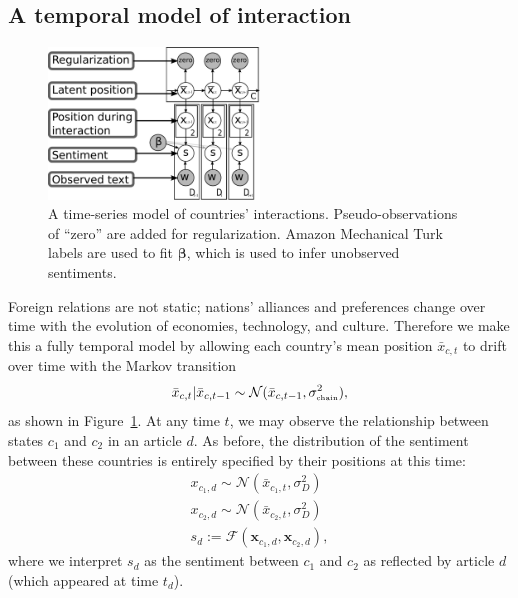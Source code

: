 \subsection{A temporal model of interaction}
\begin{figure}
  \center
  \vspace{-55pt}
  \includegraphics[width=0.5\textwidth]{chapter_foreign_relations/figures/countries_gm.pdf}
  \caption{A time-series model of countries' interactions.
    Pseudo-observations of ``zero'' are added for regularization.
    Amazon Mechanical Turk labels are used to fit $\bm \beta$, which is
    used to infer unobserved sentiments.}
  \label{fig:fa_gm}
\end{figure}

Foreign relations are not static; nations' alliances and preferences
change over time with the evolution of economies, technology, and
culture.  Therefore we make this a fully temporal model by
allowing each country's mean position $\bar x_{c,t}$ to drift over
time with the Markov transition
\begin{align}
  \label{eq:fr_interaction_position_given_mean}
  \bar x_{c,t} | \bar x_{c,t-1} \sim \mathcal{N}(\bar x_{c,t-1},
  \sigma_{\mbox{\tiny chain}}^2),
\end{align}
as shown in Figure~\ref{fig:fa_gm}. At any time $t$, we may observe
the relationship between states $c_1$ and $c_2$ in an article $d$.  As
before, the distribution of the sentiment between these countries is
entirely specified by their positions at this time:
\begin{align}
  x_{c_1,d} \sim \mathcal{N}(\bar x_{c_1, t}, \sigma_D^2) \nonumber \\
  x_{c_2,d} \sim \mathcal{N}(\bar x_{c_2, t}, \sigma_D^2) \nonumber \\
  s_d := \mathcal{F}(\bm x_{c_1,d}, \bm x_{c_2,d}), \label{eq:sentiment_space}
\end{align}
where we interpret $s_d$ as the sentiment between $c_1$ and $c_2$ as
reflected by article $d$ (which appeared at time $t_d$).


